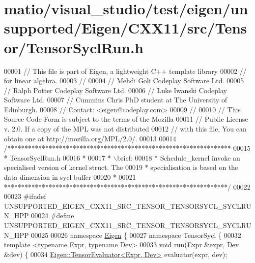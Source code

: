 \hypertarget{matio_2visual__studio_2test_2eigen_2unsupported_2_eigen_2_c_x_x11_2src_2_tensor_2_tensor_sycl_run_8h_source}{}\section{matio/visual\+\_\+studio/test/eigen/unsupported/\+Eigen/\+C\+X\+X11/src/\+Tensor/\+Tensor\+Sycl\+Run.h}
\label{matio_2visual__studio_2test_2eigen_2unsupported_2_eigen_2_c_x_x11_2src_2_tensor_2_tensor_sycl_run_8h_source}

\begin{DoxyCode}
00001 \textcolor{comment}{// This file is part of Eigen, a lightweight C++ template library}
00002 \textcolor{comment}{// for linear algebra.}
00003 \textcolor{comment}{//}
00004 \textcolor{comment}{// Mehdi Goli    Codeplay Software Ltd.}
00005 \textcolor{comment}{// Ralph Potter  Codeplay Software Ltd.}
00006 \textcolor{comment}{// Luke Iwanski  Codeplay Software Ltd.}
00007 \textcolor{comment}{// Cummins Chris PhD student at The University of Edinburgh.}
00008 \textcolor{comment}{// Contact: <eigen@codeplay.com>}
00009 \textcolor{comment}{//}
00010 \textcolor{comment}{// This Source Code Form is subject to the terms of the Mozilla}
00011 \textcolor{comment}{// Public License v. 2.0. If a copy of the MPL was not distributed}
00012 \textcolor{comment}{// with this file, You can obtain one at http://mozilla.org/MPL/2.0/.}
00013 
00014 \textcolor{comment}{/*****************************************************************}
00015 \textcolor{comment}{ * TensorSyclRun.h}
00016 \textcolor{comment}{ *}
00017 \textcolor{comment}{ * \(\backslash\)brief:}
00018 \textcolor{comment}{ * Schedule\_kernel invoke an specialised version of kernel struct. The}
00019 \textcolor{comment}{ * specialisation is based on the data dimension in sycl buffer}
00020 \textcolor{comment}{ *}
00021 \textcolor{comment}{*****************************************************************/}
00022 
00023 \textcolor{preprocessor}{#ifndef UNSUPPORTED\_EIGEN\_CXX11\_SRC\_TENSOR\_TENSORSYCL\_SYCLRUN\_HPP}
00024 \textcolor{preprocessor}{#define UNSUPPORTED\_EIGEN\_CXX11\_SRC\_TENSOR\_TENSORSYCL\_SYCLRUN\_HPP}
00025 
00026 \textcolor{keyword}{namespace }\hyperlink{namespace_eigen}{Eigen} \{
00027 \textcolor{keyword}{namespace }TensorSycl \{
00032 \textcolor{keyword}{template} <\textcolor{keyword}{typename} Expr, \textcolor{keyword}{typename} Dev>
00033 \textcolor{keywordtype}{void} run(Expr &expr, Dev &dev) \{
00034   \hyperlink{struct_eigen_1_1_tensor_evaluator}{Eigen::TensorEvaluator<Expr, Dev>} evaluator(expr, dev);

\end{DoxyCode}
